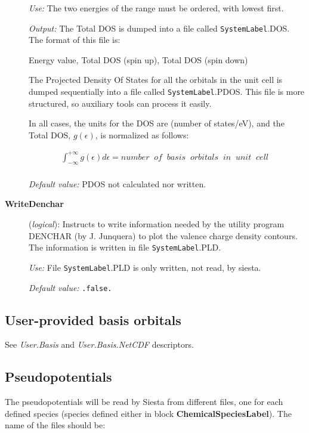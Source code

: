 \documentclass[11pt]{article}
\begin{document}
\begin{description}
{\it Use:} The two energies of the range must be ordered, with lowest
first. 

{\it Output:} The Total DOS is dumped into a file
called {\tt SystemLabel}.DOS. The format of this file is:

Energy value, Total DOS (spin up), Total DOS (spin down)

The Projected Density Of States for all the orbitals in the unit cell
is dumped sequentially into a file called {\tt SystemLabel}.PDOS. This
file is more structured, so auxiliary tools can process it easily.

In all cases, the units for the DOS are (number of states/eV), and the
Total DOS, $g \left(\epsilon\right)$, is normalized as follows:

\begin{eqnarray}
   \int_{-\infty}^{+\infty} g \left(\epsilon\right) d\epsilon = 
   number \;\; of \;\; basis \;\; orbitals \;\; in \;\;  unit \;\; cell \;\;
   \nonumber \\
\end{eqnarray}


{\it Default value:} PDOS not calculated nor written.

\item[{\bf WriteDenchar}] ({\it logical}):
Instructs to write information needed by the utility program
DENCHAR (by J. Junquera) to plot the valence charge density
contours. The information is written in file {\tt SystemLabel}.PLD.
 
{\it Use:} File {\tt SystemLabel}.PLD is only written, not read, by siesta.
 
{\it Default value:} {\tt .false.}

\end{description}
        

\subsection{User-provided basis orbitals}

See {\it User.Basis} and {\it User.Basis.NetCDF} descriptors.

\subsection{Pseudopotentials}

The pseudopotentials will be read by {\sc Siesta} from different files, one
for each defined species (species defined either in block
{\bf ChemicalSpeciesLabel}).
The name of the files should be:
\end{document}
